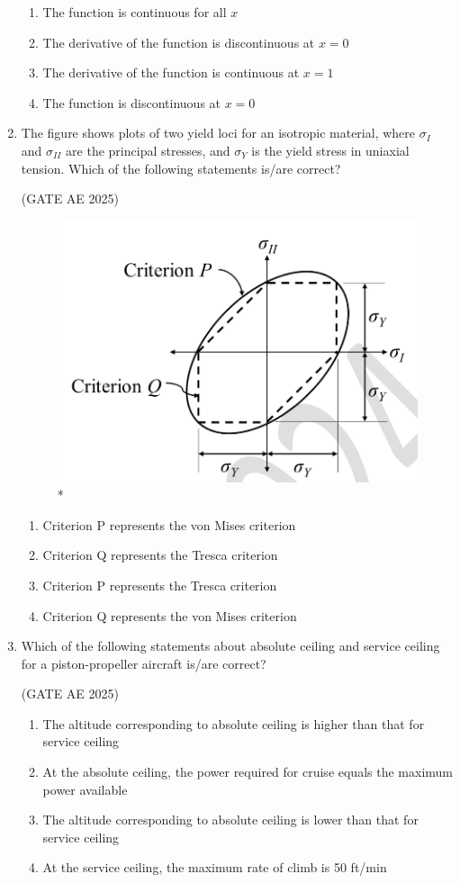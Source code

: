 \documentclass[journal,12pt,onecolumn]{IEEEtran}
\theoremstyle{remark}
\begin{document}
\begin{flushleft}
\begin{enumerate}
\begin{enumerate}
\item The function is continuous for all $x$  
\item The derivative of the function is discontinuous at $x = 0$  
\item The derivative of the function is continuous at $x = 1$  
\item The function is discontinuous at $x = 0$ 
\end{enumerate}

\item The figure shows plots of two yield loci for an isotropic material, where $\sigma_I$ and $\sigma_{II}$ are the principal stresses, and $\sigma_Y$ is the yield stress in uniaxial tension. Which of the following statements is/are correct?  

\hfill (GATE AE 2025)

\begin{figure}
\includegraphics[width=0.5\columnwidth]{figs/46.png}
\caption{*}
    \label{fig:placeholder}
\end{figure}

\begin{enumerate}
\item Criterion P represents the von Mises criterion  
\item Criterion Q represents the Tresca criterion  
\item Criterion P represents the Tresca criterion  
\item Criterion Q represents the von Mises criterion  
\end{enumerate} 

\item Which of the following statements about absolute ceiling and service ceiling for a piston-propeller aircraft is/are correct?  

\hfill (GATE AE 2025)

\begin{enumerate}
    \item The altitude corresponding to absolute ceiling is higher than that for service ceiling  
    \item At the absolute ceiling, the power required for cruise equals the maximum power available  
    \item The altitude corresponding to absolute ceiling is lower than that for service ceiling  
    \item At the service ceiling, the maximum rate of climb is 50 ft/min  
\end{enumerate}


\end{enumerate}
\end{flushleft}
\end{document}
